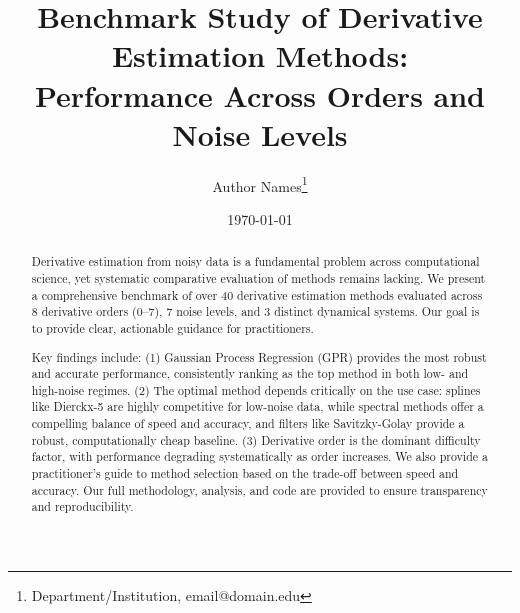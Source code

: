 \documentclass[11pt]{article}
\title{Benchmark Study of Derivative Estimation Methods:\\
Performance Across Orders and Noise Levels}
\author{
    Author Names\thanks{Department/Institution, email@domain.edu}
}
\date{\today}
\newcommand{\TODO}[1]{\textcolor{red}{\textbf{[TODO: #1]}}}
\begin{document}
\maketitle

\begin{abstract}
Derivative estimation from noisy data is a fundamental problem across computational science, yet systematic comparative evaluation of methods remains lacking. We present a comprehensive benchmark of over 40 derivative estimation methods evaluated across 8 derivative orders (0--7), 7 noise levels, and 3 distinct dynamical systems. Our goal is to provide clear, actionable guidance for practitioners.

Key findings include: (1) Gaussian Process Regression (GPR) provides the most robust and accurate performance, consistently ranking as the top method in both low- and high-noise regimes. (2) The optimal method depends critically on the use case: splines like Dierckx-5 are highly competitive for low-noise data, while spectral methods offer a compelling balance of speed and accuracy, and filters like Savitzky-Golay provide a robust, computationally cheap baseline. (3) Derivative order is the dominant difficulty factor, with performance degrading systematically as order increases. We also provide a practitioner's guide to method selection based on the trade-off between speed and accuracy. Our full methodology, analysis, and code are provided to ensure transparency and reproducibility.
\end{abstract}

\tableofcontents
\newpage










\end{document}
